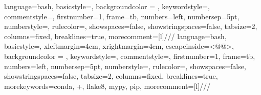 		{
				language=bash,
				basicstyle=\footnotesize\ttfamily, %
				backgroundcolor = \color{mysticlight}, %
				keywordstyle=\color{vbablue},   %
				commentstyle=\color{vbagreen},  %
				firstnumber=1,                	%
				frame=tb,	                	%
				numbers=left,                   %
				numbersep=5pt,                  %
				numberstyle=\tiny\color{gray},	%
				rulecolor=\color{black},        %
				showspaces=false,               %
				showstringspaces=false,         %
				tabsize=2,		                %
				columns=fixed,					%
				breaklines=true,				%
				morecomment=[l]{///}				%
		}
		{
				language=bash,
				basicstyle=\color{white}\footnotesize\ttfamily, %
				xleftmargin=4cm,
				xrightmargin=4cm,
				escapeinside={<@}{@>},
				backgroundcolor = \color{black}, %
				keywordstyle=\color{yellow},   %
				commentstyle=\color{vbagreen},  %
				firstnumber=1,                	%
				frame=tb,	                	%
				numbers=left,                   %
				numbersep=5pt,                  %
				numberstyle=\tiny\color{gray},	%
				rulecolor=\color{black},        %
				showspaces=false,               %
				showstringspaces=false,         %
				tabsize=2,		                %
				columns=fixed,					%
				breaklines=true,				%
				morekeywords={conda, +, flake8, mypy, pip},		%
				morecomment=[l]{///}			%
		}
